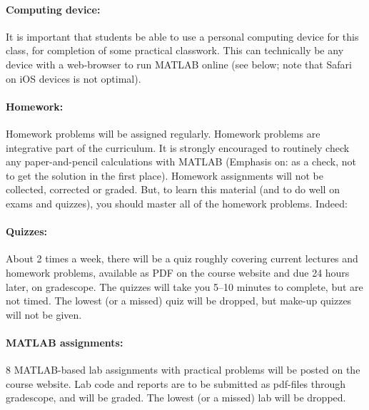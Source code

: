\documentclass[11pt,letter]{article}
\begin{document}
\paragraph{Computing device:} It is important that students be able to use a personal computing device for this class, for completion of some practical classwork. This can technically be any device with a web-browser to run MATLAB online (see below; note that Safari on iOS devices is not optimal). 

\paragraph{Homework:} Homework problems will be assigned regularly. Homework problems are integrative part of the curriculum. It is strongly encouraged to routinely check any paper-and-pencil calculations with MATLAB (Emphasis on: as a check, not to get the solution in the first place). Homework assignments will not be collected, corrected or graded. But, to learn this material (and to do well on exams and quizzes), you should master all of the homework problems. Indeed:

\paragraph{Quizzes:}About 2 times a week, there will be a quiz roughly covering current lectures and homework problems, available as PDF on the course website and due 24 hours later, on gradescope. The quizzes will take you 5--10 minutes to complete, but are not timed. The lowest (or a missed) quiz will be dropped, but make-up quizzes will not be given. 

\paragraph{MATLAB assignments:} 8 MATLAB-based lab assignments with practical problems will be posted on the course website. %
Lab code and reports are to be submitted as pdf-files through gradescope, and will be graded. The lowest (or a missed) lab will be dropped.
\end{document}
